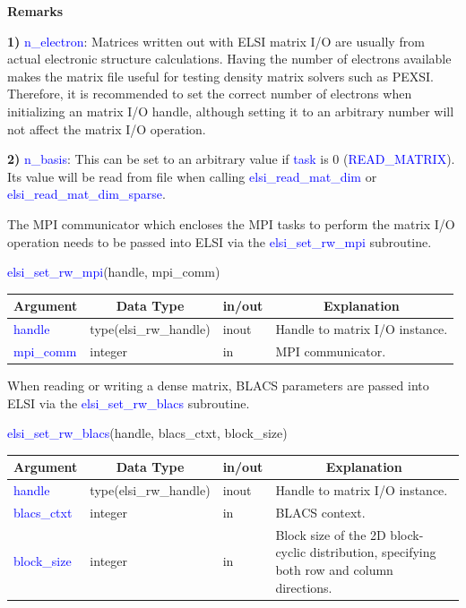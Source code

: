 \documentclass{report}
\newcommand{\tcb}[1]{\textcolor{blue}{#1}}
\begin{document}
\newpage
\textbf{Remarks}

\textbf{1)} \tcb{n\_electron}: Matrices written out with ELSI matrix I/O are usually from actual electronic structure calculations. Having the number of electrons available makes the matrix file useful for testing density matrix solvers such as PEXSI. Therefore, it is recommended to set the correct number of electrons when initializing an matrix I/O handle, although setting it to an arbitrary number will not affect the matrix I/O operation.

\textbf{2)} \tcb{n\_basis}: This can be set to an arbitrary value if \tcb{task} is 0 (\tcb{READ\_MATRIX}). Its value will be read from file when calling \tcb{elsi\_read\_mat\_dim} or \tcb{elsi\_read\_mat\_dim\_sparse}.

The MPI communicator which encloses the MPI tasks to perform the matrix I/O operation needs to be passed into ELSI via the \tcb{elsi\_set\_rw\_mpi} subroutine.

\begin{labeling}{\hspace{6cm}}
\item [\hspace{0.3cm} \tcb{elsi\_set\_rw\_mpi}(handle, mpi\_comm)]
\end{labeling}

\begin{tabular}[]{|p{20mm}|p{45mm}|p{15mm}|p{85mm}|}
\hline
\multicolumn{1}{|c|}{\textbf{Argument}} & \multicolumn{1}{c|}{\textbf{Data Type}} & \multicolumn{1}{c|}{\textbf{in/out}} & \multicolumn{1}{c|}{\textbf{Explanation}}\\
\hline
\tcb{handle}    & type(elsi\_rw\_handle) & inout & Handle to matrix I/O instance.\\
\hline
\tcb{mpi\_comm} & integer                & in    & MPI communicator.\\
\hline
\end{tabular}

When reading or writing a dense matrix, BLACS parameters are passed into ELSI via the \tcb{elsi\_set\_rw\_blacs} subroutine.
\begin{labeling}{\hspace{6cm}}
\item [\hspace{0.3cm} \tcb{elsi\_set\_rw\_blacs}(handle, blacs\_ctxt, block\_size)]
\end{labeling}

\begin{tabular}[]{|p{20mm}|p{45mm}|p{15mm}|p{85mm}|}
\hline
\multicolumn{1}{|c|}{\textbf{Argument}} & \multicolumn{1}{c|}{\textbf{Data Type}} & \multicolumn{1}{c|}{\textbf{in/out}} & \multicolumn{1}{c|}{\textbf{Explanation}}\\
\hline
\tcb{handle}      & type(elsi\_rw\_handle) & inout & Handle to matrix I/O instance.\\
\hline
\tcb{blacs\_ctxt} & integer                & in    & BLACS context.\\
\hline
\tcb{block\_size} & integer                & in    & Block size of the 2D block-cyclic distribution, specifying both row and column directions.\\
\hline
\end{tabular}
\end{document}
